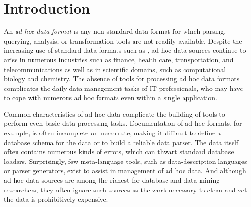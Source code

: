 \section{Introduction}
\label{sec:intro}


An {\em ad hoc data format} is any non-standard data format for which
parsing, querying, analysis, or transformation tools are not readily
available.  Despite the increasing use of standard data formats such
as \xml{}, ad hoc data sources continue to arise in numerous
industries such as finance, health care, transportation, and
telecommunications as well as in scientific domains, such as
computational biology and chemistry.  The absence of tools for
processing ad hoc data formats complicates the daily data-management
tasks of IT professionals, who may have to cope with numerous ad
hoc formats even within a single application.  

Common characteristics of ad hoc data complicate the building of tools
to perform even basic data-processing tasks.  Documentation of ad hoc
formats, for example, is often incomplete or inaccurate, making it
difficult to define a database schema for the data or to build a
reliable data parser.  The data itself often contains numerous kinds
of errors, which can thwart standard database loaders.  Surprisingly,
few meta-language tools, such as data-description languages or parser
generators, exist to assist in management of ad hoc data.  And
although ad hoc data sources are among the richest for database and
data mining researchers, they often ignore such sources as the work
necessary to clean and vet the data is prohibitively expensive.




